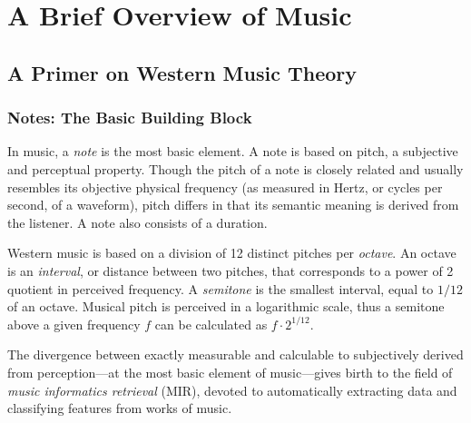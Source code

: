 \chapter{A Brief Overview of Music}

\section{A Primer on Western Music Theory}

\subsection{Notes: The Basic Building Block}

In music, a \textit{note} is the most basic element. A note is based on pitch, a subjective and perceptual property. Though the pitch of a note is closely related and usually resembles its objective physical frequency (as measured in Hertz, or cycles per second, of a waveform), pitch differs in that its semantic meaning is derived from the listener. A note also consists of a duration.

Western music is based on a division of 12 distinct pitches per \textit{octave}. An octave is an \textit{interval}, or distance between two pitches, that corresponds to a power of 2 quotient in perceived frequency. A \textit{semitone} is the smallest interval, equal to $1/12$ of an octave. Musical pitch is perceived in a logarithmic scale, thus a semitone above a given frequency $f$ can be calculated as $f \cdot 2^{1/12}$.

The divergence between exactly measurable and calculable to subjectively derived from perception---at the most basic element of music---gives birth to the field of \textit{music informatics retrieval} (MIR), devoted to automatically extracting data and classifying features from works of music.